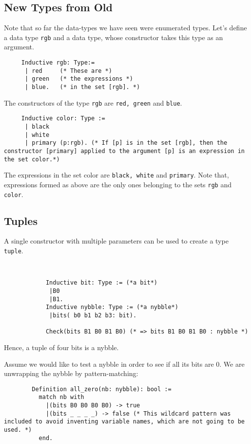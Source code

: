 \subsection{New Types from Old}
     
     
	 Note that so far the data-types we have seen were enumerated types.
	 Let's define a data type \lstinline!rgb! and a data type, whose constructor takes this type as an argument.
	\begin{lstlisting}
	 Inductive rgb: Type:=
	  | red     (* These are *)
	  | green   (* the expressions *)
	  | blue.   (* in the set [rgb]. *)
	 \end{lstlisting}
	 The constructors of the type \lstinline!rgb! are \lstinline!red, green! and \lstinline!blue!. 
	 
	 \begin{lstlisting}
	 Inductive color: Type := 
	  | black
	  | white
	  | primary (p:rgb). (* If [p] is in the set [rgb], then the constructor [primary] applied to the argument [p] is an expression in the set color.*) 
	 \end{lstlisting}
	 
	 The expressions in the set color are \lstinline!black, white! and \lstinline!primary!.
	 Note that, expressions formed as above are the only ones belonging to the sets \lstinline!rgb! and \lstinline!color!.
	 

\subsection{Tuples}

    A single constructor with multiple parameters can be used to create a type \lstinline! tuple!.
	\begin{example}~\\\vspace{-10mm}
 	 	\begin{lstlisting}
 	 		Inductive bit: Type := (*a bit*) 
 	 		 |B0
 	 		 |B1.
 		    Inductive nybble: Type := (*a nybble*)
 		   	 |bits( b0 b1 b2 b3: bit).
 		   			 	
 		   	Check(bits B1 B0 B1 B0) (* => bits B1 B0 B1 B0 : nybble *)
 		\end{lstlisting}
 		Hence, a tuple of four bits is a nybble.
 		
 		Assume we would like to test a nybble in order to see if all its bits are 0. We are unwrapping the nybble by pattern-matching:
 		\begin{lstlisting}
 		Definition all_zero(nb: nybble): bool :=
 		  match nb with
 	  	    |(bits B0 B0 B0 B0) -> true
 		    |(bits _ _ _ _) -> false (* This wildcard pattern was included to avoid inventing variable names, which are not going to be used. *) 
 		  end.
 		 \end{lstlisting}
 	\end{example}
 	

